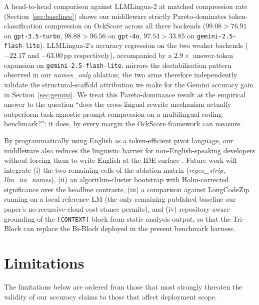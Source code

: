 \documentclass[11pt,a4paper,twocolumn]{article}
\begin{document}
A head-to-head comparison against LLMLingua-2 \cite{pan2024llmlingua2} at matched compression rate (Section~\ref{sec:baselines}) shows our middleware strictly Pareto-dominates token-classification compression on OckScore across all three backends ($99.08 > 76.91$ on \texttt{gpt-3.5-turbo}, $98.88 > 96.56$ on \texttt{gpt-4o}, $97.54 > 33.85$ on \texttt{gemini-2.5-flash-lite}). LLMLingua-2's accuracy regression on the two weaker backends ($-22.17$ and $-63.00$\,pp respectively), accompanied by a $2.9\times$ answer-token expansion on \texttt{gemini-2.5-flash-lite}, mirrors the destabilisation pattern observed in our \textit{names\_only} ablation; the two arms therefore independently validate the structural-scaffold attribution we make for the Gemini accuracy gain in Section~\ref{sec:gemini}. We treat this Pareto-dominance result as the empirical answer to the question ``does the cross-lingual rewrite mechanism actually outperform task-agnostic prompt compression on a multilingual coding benchmark?'': it does, by every margin the OckScore framework can measure.

By programmatically using English as a token-efficient pivot language, our middleware also reduces the linguistic barrier for non-English-speaking developers without forcing them to write English at the IDE surface \cite{ahuja2025efficientxlang}. Future work will integrate (i) the two remaining cells of the ablation matrix (\textit{regex\_strip}, \textit{llm\_no\_names}), (ii) an algorithm-cluster bootstrap with Holm-corrected significance over the headline contrasts, (iii) a comparison against LongCodeZip \cite{shi2025longcodezip} running on a local reference LM (the only remaining published baseline our paper's no-recursive-cloud-cost stance permits), and (iv) repository-aware grounding of the \texttt{[CONTEXT]} block from static analysis output, so that the Tri-Block can replace the Bi-Block deployed in the present benchmark harness.

\section{Limitations}
\label{sec:limitations}
The limitations below are ordered from those that most strongly threaten the validity of our accuracy claims to those that affect deployment scope.
\end{document}
